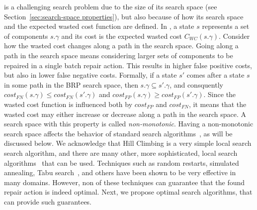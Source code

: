 {\brpswc{} is a challenging search problem due to the size of its search space (see Section~\ref{sec:search-space properties}), 
but also because of how its search space and the expected wasted cost function are defined. 
In \brpswc{}, a state $s$ represents a set of components $s.\gamma$ 
and its cost is the expected wasted cost $C_{WC}(s.\gamma)$. 
Consider how the wasted cost changes along a path in the search space. 
Going along a path in the search space means considering larger sets of components to be repaired in a single batch repair action. 
This results in higher false positive costs, but also in lower false negative costs. 
Formally, if a state $s'$ comes after a state $s$ in some path in the BRP search space, 
then $s.\gamma\subseteq s'.\gamma$, and consquently 
$cost_{FN}(s.\gamma)\leq cost_{FN}(s'.\gamma)$ 
and $cost_{FP}(s.\gamma)\geq cost_{FP}(s'.\gamma)$. 
Since the wasted cost function is influenced both by $cost_{FP}$ and $cost_{FN}$, 
it means that the wasted cost may either increase or decrease along a path in the search space. 
A search space with this property is called \emph{non-monotonic}. 
Having a non-monotonic search space affects the behavior of standard search algorithms~\cite{stern2014max}, as will be discussed below. 
We acknowledge that Hill Climbing is a very simple local search search algorithm, and there are many other, more sophisticated, local search algorithms~\cite{lourencco2003iterated} that can be used.  Techniques such as random restarts, simulated annealing, Tabu search~\cite{glover2013tabu}, and others have been shown to be very effective in many domains. However, non of these techniques can guarantee that the found repair action is indeed optimal. Next, we propose optimal search algorithms, that can provide such guarantees. 















}
